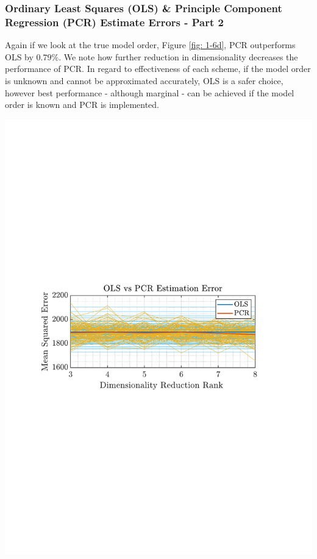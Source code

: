 \documentclass[12pt]{article}
\begin{document}
 	\subsubsection{Ordinary Least Squares (OLS) \& Principle Component Regression (PCR)  Estimate Errors - Part 2}
 	\begin{minipage}{0.49\textwidth}
 		Again if we look at the true model order, Figure \ref{fig: 1-6d}, PCR outperforms OLS by $0.79\%$. We note how further reduction in dimensionality decreases the performance of PCR. In regard to effectiveness of each scheme, if the model order is unknown and cannot be approximated accurately, OLS is a safer choice, however best performance - although marginal - can be achieved if the model order is known and PCR is implemented.
 	\end{minipage}%
	 \begin{minipage}{0.04\textwidth}
	 	  \hspace*{0.04\textwidth}
	 \end{minipage}%
 	\begin{minipage}{0.49\textwidth}
		\centering
 		\includegraphics[trim={2.2cm 11.2cm 3.15cm  11.2cm}, clip, width=\textwidth]{../MATLAB/figures/q1_6d_fig01.pdf} 
 		\captionsetup{justification=centering}
 		\label{fig: 1-6d}
 	\end{minipage}%
 
\end{document}
